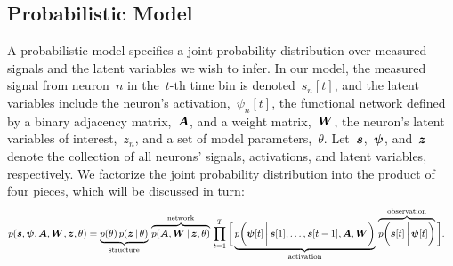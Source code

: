 \subsection{Probabilistic Model}
A probabilistic model specifies a joint probability distribution over measured signals and the latent variables we wish to infer. 
In our model, the measured signal from neuron~$n$ in the~${t\text{-th}}$ time bin is denoted~$s_n[t]$, and the latent variables include the neuron's activation,~$\psi_n[t]$, the functional network defined by a binary adjacency matrix,~$\boldsymbol{A}$, and a weight matrix,~$\boldsymbol{W}$, the neuron's latent variables of interest,~$z_n$, and a set of model parameters,~$\theta$. 
Let~$\boldsymbol{s}$,~$\boldsymbol{\psi}$, and~$\boldsymbol{z}$ denote the collection of all neurons' signals, activations, and latent variables, respectively.
We factorize the joint probability distribution into the product of four pieces, which will be discussed in turn:
\begin{align}
p(\boldsymbol{s}, \boldsymbol{\psi}, \boldsymbol{A}, \boldsymbol{W}, \boldsymbol{z}, \theta) 
&= 
\underbrace{p(\theta) \, p(\boldsymbol{z} \,|\, \theta)}_\text{structure} \, 
\overbrace{p(\boldsymbol{A}, \boldsymbol{W} \,|\, \boldsymbol{z}, \theta)}^\text{network} \, 
\prod_{t=1}^T \bigg[ 
\underbrace{p \bigg( \boldsymbol{\psi}[t] \, \bigg| \, \boldsymbol{s}[1], \ldots, \boldsymbol{s}[t-1], \boldsymbol{A}, \boldsymbol{W} \bigg)}_\text{activation} \, 
\overbrace{p \bigg(\boldsymbol{s}[t] \, \bigg| \, \boldsymbol{\psi}[t] \bigg)}^\text{observation} \bigg].
\end{align}


